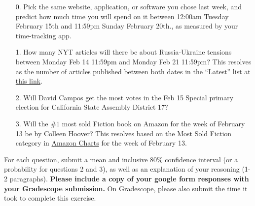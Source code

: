 \documentclass[11pt]{article}
\begin{document}
\begin{enumerate}
	\item[0.] Pick the same website, application, or software you chose last week, and predict how much time you will spend on it between 12:00am Tuesday February 15th and 11:59pm Sunday February 20th., as measured by your time-tracking app.

	\item[1.] How many NYT articles will there be about Russia-Ukraine tensions between Monday Feb 14 11:59pm and Monday Feb 21 11:59pm? This resolves as the number of articles published between both dates in the ``Latest'' list at \href{https://www.nytimes.com/news-event/ukraine-russia?name=styln-russia-ukraine&region=TOP_BANNER&block=storyline_menu_recirc&action=click&pgtype=LegacyCollection&variant=0_Control}{this link}.
	
	\item[2.] Will David Campos get the most votes in the Feb 15 Special primary election for California State Assembly District 17?
 
	\item[3.] Will the $\#1$ most sold Fiction book on Amazon for the week of February 13 be by Colleen Hoover? This resolves based on the Most Sold Fiction category in \href{https://www.amazon.com/charts/}{Amazon Charts} for the week of February 13.
\end{enumerate}

For each question, submit a mean and inclusive 80\% confidence interval (or a probability for questions 2 and 3), as well as an explanation of your reasoning (1-2 paragraphs). \textbf{Please include a copy of your google form responses with your Gradescope submission.} On Gradescope, please also submit the time it took to complete this exercise.
\end{document}
